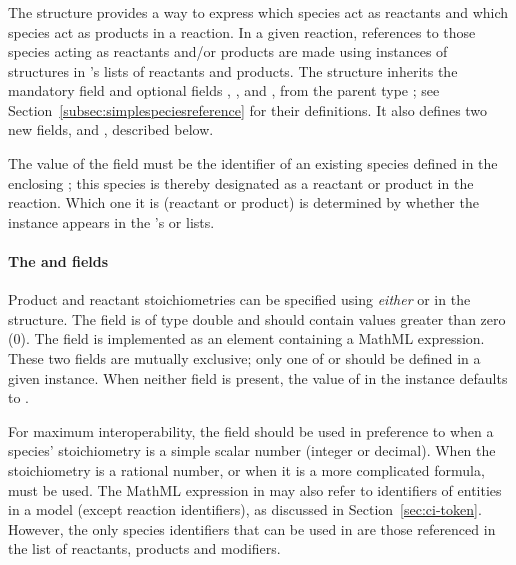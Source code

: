 \subsubsection{}
\label{subsec:speciesreference}

The \Reaction structure provides a way to express which species
act as reactants and which species act as products in a reaction.
In a given reaction, references to those species acting as
reactants and/or products are made using instances of
\SpeciesReference structures in \Reaction's lists of reactants and
products.  The \SpeciesReference structure inherits the mandatory
field  and optional fields ,
, and , from the parent type
\SimpleSpeciesReference; see
Section~\ref{subsec:simplespeciesreference} for their definitions.
It also defines two new fields,  and
, described below.

The value of the  field must be the identifier of
an existing species defined in the enclosing \Model; this species
is thereby designated as a reactant or product in the reaction.
Which one it is (reactant or product) is determined by whether the
\SpeciesReference instance appears in the \Reaction's
 or  lists.


\paragraph{The  and 
  fields}

Product and reactant stoichiometries can be specified using
\emph{either}  or 
in the \SpeciesReference structure.  The 
field is of type double and should contain values greater than
zero (0).  The  field is implemented as
an element containing a MathML expression.  These two fields are
mutually exclusive; only one of  or
 should be defined in a given
\SpeciesReference instance.  When neither field is present, the
value of  in the \SpeciesReference instance
defaults to .

For maximum interoperability, the  field
should be used in preference to  when a
species' stoichiometry is a simple scalar number (integer or
decimal).  When the stoichiometry is a rational number, or when it
is a more complicated formula,  must be
used.  The MathML expression in  may also
refer to identifiers of entities in a model (except reaction
identifiers), as discussed in Section~\ref{sec:ci-token}.
However, the only species identifiers that can be used in
 are those referenced in the \Reaction
list of reactants, products and modifiers.

